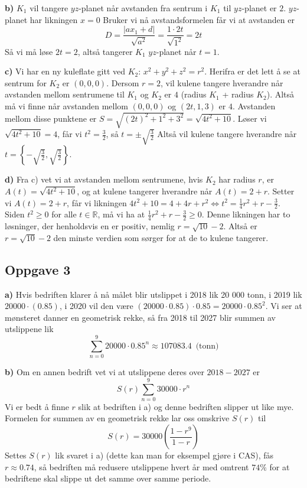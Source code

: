 \textbf{b)} $K_1$ vil tangere $yz$-planet når avstanden fra sentrum i $K_1$ til $yz$-planet er $2$. $yz$-planet har likningen $x=0$ Bruker vi nå avstandsformelen får vi at avstanden er $$D=\frac{|ax_1+d|}{\sqrt{a^2}} = \frac{1\cdot2t}{\sqrt{1^2}}=2t$$ Så vi må løse $2t=2$, altså tangerer $K_1$ $yz$-planet når $t=1$. \newline

\textbf{c)} Vi har en ny kuleflate gitt ved $K_2:\, x^2+y^2+z^2=r^2$. Herifra er det lett å se at sentrum for $K_2$ er $(0,0,0)$. Dersom $r=2$, vil kulene tangere hverandre når avstanden mellom sentrumene til $K_1$ og $K_2$ er $4$ (radius $K_1$ + radius $K_2$). Altså må vi finne når avstanden mellom $(0,0,0)$ og $(2t,1,3)$ er $4$. Avstanden mellom disse punktene er $S=\sqrt{(2t)^2+1^2+3^2}=\sqrt{4t^2+10}$. Løser vi $\sqrt{4t^2+10}=4$, får vi $t^2=\frac32$, så $t=\pm \sqrt{\frac32}$ Altså vil kulene tangere hverandre når $t=\displaystyle \left \{-\sqrt{\frac{3}{2}}, \sqrt{\frac32}\right \}$. \newline

\textbf{d)} Fra c) vet vi at avstanden mellom sentrumene, hvis $K_2$ har radius $r$, er $A(t)=\sqrt{4t^2+10}$, og at kulene tangerer hverandre når $A(t)=2+r$. Setter vi $A(t)=2+r$, får vi likningen $4t^2+10=4+4r+r^2 \Longleftrightarrow t^2 = \frac14r^2+r-\frac{3}{2}$. Siden $t^2\geq0$ for alle $t \in \mathbb{R}$, må vi ha at $\frac14r^2+r-\frac{3}{2}\geq0$. Denne likningen har to løsninger, der henholdsvis en er positiv, nemlig $r=\sqrt{10}-2$. Altså er $r=\sqrt{10}-2$ den minste verdien som sørger for at de to kulene tangerer.

\subsection{Oppgave 3}
\textbf{a)} Hvis bedriften klarer å nå målet blir utslippet i 2018 lik 20 000 tonn, i 2019 lik $20 000\cdot(0.85)$, i 2020 vil den være $(20000\cdot 0.85)\cdot 0.85 = 20000 \cdot 0.85^2$. Vi ser at mønsteret danner en geometrisk rekke, så fra 2018 til 2027 blir summen av utslippene lik $$\sum_{n=0}^9 20000\cdot 0.85^n \approx 107083.4 \, \text{ (tonn)}$$

\textbf{b)} Om en annen bedrift vet vi at utslippene deres over $2018-2027$ er $$S(r)\sum_{n=0}^{9} 30000\cdot r^n$$ Vi er bedt å finne $r$ slik at bedriften i a) og denne bedriften slipper ut like mye. Formelen for summen av en geometrisk rekke lar oss omskrive $S(r)$ til $$S(r)=30000 \left(\frac{1-r^9}{1-r}\right)$$ Settes $S(r)$ lik svaret i a) (dette kan man for eksempel gjøre i CAS), fås $r\approx 0.74$, så bedriften må redusere utslippene hvert år med omtrent $74 \%$ for at bedriftene skal slippe ut det samme over samme periode.

